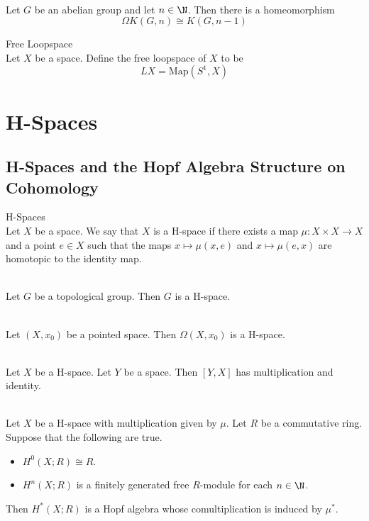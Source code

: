 \documentclass[a4paper]{article}
\begin{document}
\begin{lmm}{}{}\\
Let $G$ be an abelian group and let $n\in\N$. Then there is a homeomorphism $$\Omega K(G,n)\cong K(G,n-1)$$
\end{lmm}

\begin{defn}{Free Loopspace}{}\\
Let $X$ be a space. Define the free loopspace of $X$ to be $$LX=\text{Map}(S^1,X)$$
\end{defn}


\pagebreak
\section{H-Spaces}
\subsection{H-Spaces and the Hopf Algebra Structure on Cohomology}
\begin{defn}{H-Spaces}{}\\
Let $X$ be a space. We say that $X$ is a H-space if there exists a map $\mu:X\times X\to X$ and a point $e\in X$ such that the maps $x\mapsto\mu(x,e)$ and $x\mapsto\mu(e,x)$ are homotopic to the identity map. 
\end{defn}

\begin{eg}{}{}\\
Let $G$ be a topological group. Then $G$ is a H-space. 
\end{eg}

\begin{eg}{}{}\\
Let $(X,x_0)$ be a pointed space. Then $\Omega(X,x_0)$ is a H-space. 
\end{eg}

\begin{lmm}{}{}\\
Let $X$ be a H-space. Let $Y$ be a space. Then $[Y,X]$ has multiplication and identity. 
\end{lmm}

\begin{prp}{}{}\\
Let $X$ be a H-space with multiplication given by $\mu$. Let $R$ be a commutative ring. Suppose that the following are true. 
\begin{itemize}
\item $H^0(X;R)\cong R$. 
\item $H^n(X;R)$ is a finitely generated free $R$-module for each $n\in\N$. 
\end{itemize}
Then $H^\ast(X;R)$ is a Hopf algebra whose comultiplication is induced by $\mu^\ast$. 
\end{prp}
\end{document}
